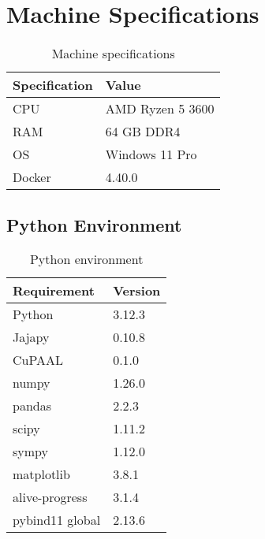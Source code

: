 \section{Machine Specifications}\label{sec:machine_specs}

\begin{table}[htb!]
    \centering
    \caption{Machine specifications}
    \label{tab:machine_specs}
    \begin{tabular}{ll}
        \toprule
        Specification & Value            \\
        \midrule
        CPU           & AMD Ryzen 5 3600 \\
        RAM           & 64 GB DDR4       \\
        OS            & Windows 11 Pro   \\
        Docker        & 4.40.0           \\
        \bottomrule
    \end{tabular}
\end{table}

\subsection{Python Environment}\label{subsec:python_env}

\begin{table}[htb!]
    \centering
    \caption{Python environment}
    \label{tab:python_env}
    \begin{tabular}{ll}
        \toprule
        Requirement     & Version \\
        \midrule
        Python          & 3.12.3  \\
        Jajapy          & 0.10.8  \\
        CuPAAL          & 0.1.0   \\
        numpy           & 1.26.0  \\
        pandas          & 2.2.3   \\
        scipy           & 1.11.2  \\
        sympy           & 1.12.0  \\
        matplotlib      & 3.8.1   \\
        alive-progress  & 3.1.4   \\
        pybind11 global & 2.13.6  \\
        \bottomrule
    \end{tabular}
\end{table}